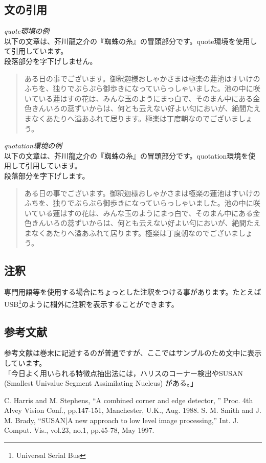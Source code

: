 \documentclass{jsarticle}					%
\begin{document}
\subsection{文の引用}
	\emph{quote環境の例}\\
	以下の文章は、芥川龍之介の『蜘蛛の糸』の冒頭部分です。quote環境を使用して引用しています。\\
	段落部分を字下げしません。
	\begin{quote}
		ある日の事でございます。御釈迦様おしゃかさまは極楽の蓮池はすいけのふちを、独りでぶらぶら御歩きになっていらっしゃいました。池の中に咲いている蓮はすの花は、みんな玉のようにまっ白で、そのまん中にある金色きんいろの蕊ずいからは、何とも云えない好よい匂においが、絶間たえまなくあたりへ溢あふれて居ります。極楽は丁度朝なのでございましょう。
	\end{quote}
	\emph{quotation環境の例}\\
	以下の文章は、芥川龍之介の『蜘蛛の糸』の冒頭部分です。quotation環境を使用して引用しています。\\
	段落部分を字下げします。	
	\begin{quotation}
		ある日の事でございます。御釈迦様おしゃかさまは極楽の蓮池はすいけのふちを、独りでぶらぶら御歩きになっていらっしゃいました。池の中に咲いている蓮はすの花は、みんな玉のようにまっ白で、そのまん中にある金色きんいろの蕊ずいからは、何とも云えない好よい匂においが、絶間たえまなくあたりへ溢あふれて居ります。極楽は丁度朝なのでございましょう。
	\end{quotation}

\subsection{注釈}
	専門用語等を使用する場合にちょっとした注釈をつける事があります。たとえばUSB\footnote{Universal Serial Bus}のように欄外に注釈を表示することができます。
	
\subsection{参考文献}
	参考文献は巻末に記述するのが普通ですが、ここではサンプルのため文中に表示しています。\\
	「今日よく用いられる特徴点抽出法には，ハリスのコーナー検出\cite{harris}やSUSAN (Smallest Univalue Segment Assimilating Nucleus)\cite{susan} がある。」

	\begin{thebibliography}{9}
		 C. Harris and M. Stephens,
			``A combined corner and edge detector, '' Proc. 4th Alvey Vision Conf.,
			pp.147-151, Manchester, U.K., Aug. 1988.
		 S. M. Smith and J. M. Brady,
			``SUSAN|A new approach to low level image processing,'' Int. J. Comput.
			Vis., vol.23, no.1, pp.45-78, May 1997.
	\end{thebibliography}
	
\end{document}
